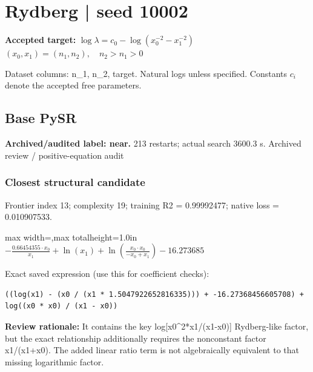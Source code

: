 \documentclass[10pt,letterpaper,landscape]{article}
\begin{document}
\section*{Rydberg | seed 10002}
\textbf{Accepted target:} $\displaystyle \log\lambda=c_0-\log\!\left(x_0^{-2}-x_1^{-2}\right)$\hfill $(x_0,x_1)=(n_1,n_2),\quad n_2>n_1>0$\par
{\small Dataset columns: n\_1, n\_2, target. Natural logs unless specified. Constants $c_i$ denote the accepted free parameters.}\par\medskip
\begin{minipage}[t]{0.485\textwidth}
\subsection*{Base PySR}
\textbf{Archived/audited label: near.} 213 restarts; actual search 3600.3 s.
{\small Archived review / positive-equation audit}
\subsubsection*{Closest structural candidate}
Frontier index 13; complexity 19; training R2 = 0.99992477; native loss = 0.010907533.
\begin{center}\begin{adjustbox}{max width=\linewidth,max totalheight=1.0in}$\displaystyle - \frac{0.66454355 \cdot x_{0}}{x_{1}} + \ln{\left(x_{1} \right)} + \ln{\left(\frac{x_{0} \cdot x_{0}}{- x_{0} + x_{1}} \right)} - 16.273685$\end{adjustbox}\end{center}
{\scriptsize Exact saved expression (use this for coefficient checks):}
\begin{lstlisting}
((log(x1) - (x0 / (x1 * 1.5047922652816335))) + -16.27368456605708) + log((x0 * x0) / (x1 - x0))
\end{lstlisting}
{\small\textbf{Review rationale:} It contains the key log[x0\textasciicircum{}2*x1/(x1-x0)] Rydberg-like factor, but the exact relationship additionally requires the nonconstant factor x1/(x1+x0). The added linear ratio term is not algebraically equivalent to that missing logarithmic factor.}

\end{minipage}
\end{document}
